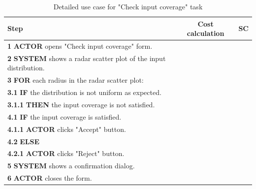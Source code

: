 \begin{table}[H]
\centering
\begin{tabular}{|l|c|c|}
\hline
\textbf{Step} & \textbf{Cost calculation} & \textbf{SC} \\
\hline
\textbf{1} \textbf{ACTOR} opens "Check input coverage" form. & & \\
\hline
\textbf{2} \textbf{SYSTEM} shows a radar scatter plot of the input distribution. & & \\
\hline
\textbf{3} \textbf{FOR} each radius in the radar scatter plot: & & \\
\hline
\textbf{3.1} \textbf{IF} the distribution is not uniform as expected. & & \\
\hline
\textbf{3.1.1} \textbf{THEN} the input coverage is not satisfied. & & \\
\hline
\textbf{4.1} \textbf{IF} the input coverage is satisfied. & & \\
\hline
\textbf{4.1.1} \textbf{ACTOR} clicks "Accept" button. & & \\
\hline
\textbf{4.2} \textbf{ELSE} & & \\
\hline
\textbf{4.2.1} \textbf{ACTOR} clicks "Reject" button. & & \\
\hline
\textbf{5} \textbf{SYSTEM} shows a confirmation dialog. & & \\
\hline
\textbf{6} \textbf{ACTOR} closes the form. & & \\
\hline
\end{tabular}
\caption{Detailed use case for "Check input coverage" task}
\label{table:check_input_coverage}
\end{table}
